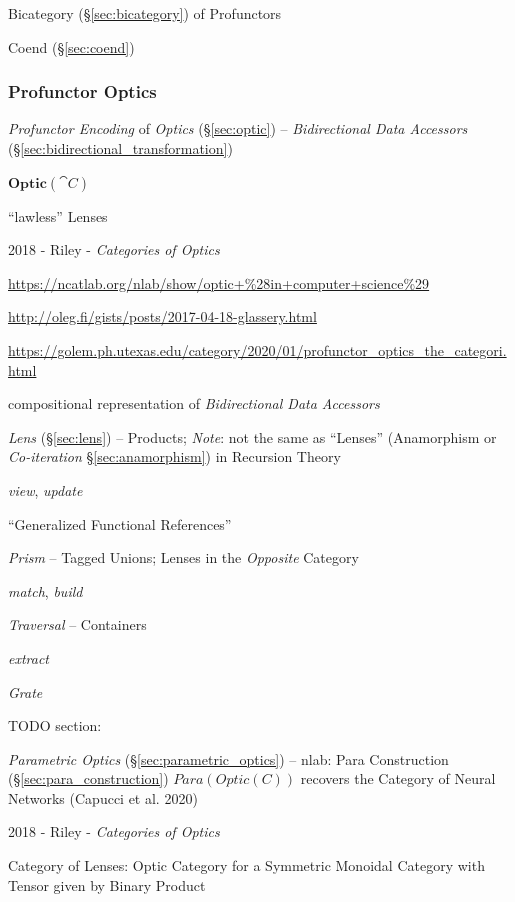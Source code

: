 Bicategory (\S\ref{sec:bicategory}) of Profunctors

Coend (\S\ref{sec:coend})



\subsubsection{Profunctor Optics}\label{sec:profunctor_optics}

\emph{Profunctor Encoding} of \emph{Optics} (\S\ref{sec:optic}) --
\emph{Bidirectional Data Accessors} (\S\ref{sec:bidirectional_transformation})

$\mathbf{Optic}(\cat{C})$

``lawless'' Lenses


2018 - Riley - \emph{Categories of Optics}

\url{https://ncatlab.org/nlab/show/optic+%28in+computer+science%29}

\url{http://oleg.fi/gists/posts/2017-04-18-glassery.html}

\url{https://golem.ph.utexas.edu/category/2020/01/profunctor_optics_the_categori.html}

compositional representation of \emph{Bidirectional Data Accessors}

\fist \emph{Lens} (\S\ref{sec:lens}) -- Products; \emph{Note}: not the same as
``Lenses'' (Anamorphism or \emph{Co-iteration} \S\ref{sec:anamorphism}) in
Recursion Theory

\emph{view}, \emph{update}

``Generalized Functional References''

\emph{Prism} -- Tagged Unions; Lenses in the \emph{Opposite} Category

\emph{match}, \emph{build}

\emph{Traversal} -- Containers

\emph{extract}

\emph{Grate}

TODO section:

\emph{Parametric Optics} (\S\ref{sec:parametric_optics}) -- nlab: Para
Construction (\S\ref{sec:para_construction}) $Para(Optic(C))$ recovers the
Category of Neural Networks (Capucci et al. 2020)

\asterism

2018 - Riley - \emph{Categories of Optics}

Category of Lenses: Optic Category for a Symmetric Monoidal Category with Tensor
given by Binary Product



